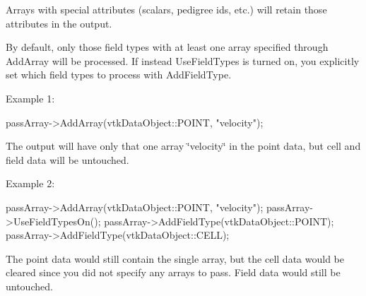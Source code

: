 Arrays with special attributes (scalars, pedigree ids, etc.) will retain those attributes in the output.

By default, only those field types with at least one array specified through Add\-Array will be processed. If instead Use\-Field\-Types is turned on, you explicitly set which field types to process with Add\-Field\-Type.

Example 1\-:


\begin{DoxyPre}
 passArray->AddArray(vtkDataObject::POINT, "velocity");
 \end{DoxyPre}


The output will have only that one array \char`\"{}velocity\char`\"{} in the point data, but cell and field data will be untouched.

Example 2\-:


\begin{DoxyPre}
 passArray->AddArray(vtkDataObject::POINT, "velocity");
 passArray->UseFieldTypesOn();
 passArray->AddFieldType(vtkDataObject::POINT);
 passArray->AddFieldType(vtkDataObject::CELL);
 \end{DoxyPre}


The point data would still contain the single array, but the cell data would be cleared since you did not specify any arrays to pass. Field data would still be untouched.

